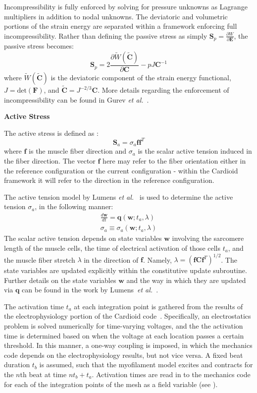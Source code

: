 Incompressibility is fully enforced by solving for pressure unknowns as Lagrange multipliers in addition to nodal unknowns. The deviatoric and volumetric portions of the strain energy are separated within a framework enforcing full incompressibility. Rather than defining the passive stress as simply $\bm{S}_p = \frac{\partial W}{\partial \bm{E}}$, the passive stress becomes:
\begin{equation}
\bm{S}_p= 2\frac{\partial{\tilde{W}(\tilde{\bm{C}})}}{\partial{\bm{C}}} - pJ\bm{C}^{-1}
\end{equation}
where $\tilde{W}(\tilde{\bm{C}})$ is the deviatoric component of the strain energy functional, $J = \text{det}(\bm{F})$, and $\tilde{\bm{C}} = J^{-2/3}\bm{C}$. More details regarding the enforcement of incompressibility can be found in Gurev \textit{et al.}~\cite{gurev_2015}.

\textbf{Active Stress}

The active stress is defined as :
\begin{equation}
\bm{S}_a = \sigma_a \bm{f} \bm{f}^{T}
\label{eqn:active}
\end{equation}
where $\bm{f}$ is the muscle fiber direction and ${\sigma_a}$ is the scalar active tension induced in the fiber direction. The vector $\bm{f}$ here may refer to the fiber orientation either in the reference configuration or the current configuration - within the Cardioid framework it will refer to the direction in the reference configuration.

The active tension model by Lumens \textit{et al.}~\cite{lumens_2009} is used to determine the active tension $\sigma_a$, in the following manner:
\begin{align}
\frac{d\bm{w}}{dt} = \bm{q}(\bm{w}; t_a, \lambda) \\
\sigma_a \equiv \sigma_a(\bm{w}; t_a, \lambda)
\end{align}
The scalar active tension depends on state variables $\bm{w}$ involving the sarcomere length of the muscle cells, the time of electrical activation of those cells $t_a$, and the muscle fiber stretch $\lambda$ in the direction of $\bm{f}$. Namely, $\lambda = (\bm{f}\bm{C}\bm{f}^T)^{1/2}$. The state variables are updated explicitly within the constitutive update subroutine. Further details on the state variables $\bm{w}$ and the way in which they are updated via $\bm{q}$ can be found in the work by Lumens~\textit{et al.}~\cite{lumens_2009}.

The activation time $t_a$ at each integration point is gathered from the results of the electrophysiology portion of the Cardioid code~\cite{richards_2013}. Specifically, an electrostatics problem is solved numerically for time-varying voltages, and the the activation time is determined based on when the voltage at each location passes a certain threshold. In this manner, a one-way coupling is imposed, in which the mechanics code depends on the electrophysiology results, but not vice versa. A fixed beat duration $t_b$ is assumed, such that the myofilament model excites and contracts for the $n$th beat at time $nt_b + t_a$. Activation times are read in to the mechanics code for each of the integration points of the mesh as a field variable (see ).

